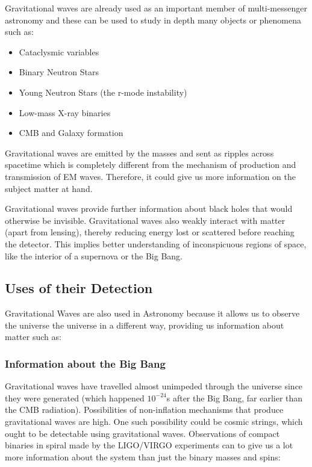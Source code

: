 \hspace{1cm}Gravitational waves are already used as an important member of multi-messenger astronomy and these can be used to study in depth many objects or phenomena such as:

\begin{itemize}

\item Cataclysmic variables
\item Binary Neutron Stars
\item Young Neutron Stars (the r-mode instability)
\item Low-mass X-ray binaries
\item CMB and Galaxy formation

\end{itemize}

\hspace{1cm}Gravitational waves are emitted by the masses and sent as ripples across spacetime which is completely different from the mechanism of production and transmission of EM waves. Therefore, it could give us more information on the subject matter at hand.

\hspace{1cm}Gravitational waves provide further information about black holes that would otherwise be invisible. Gravitational waves also weakly interact with matter (apart from lensing), thereby reducing energy lost or scattered before reaching the detector. This implies better understanding of inconspicuous regions of space, like the interior of a supernova or the Big Bang.

\subsection{Uses of their Detection}

\hspace{1cm} Gravitational Waves are also used in Astronomy because it allows us to observe the universe the universe in a different way, providing us information about matter such as:

\subsubsection*{Information about the Big Bang}
\hspace{1cm}Gravitational waves have travelled almost unimpeded through the universe since they were generated (which happened $10^{-24}$s after the Big Bang, far earlier than the CMB radiation). Possibilities of non-inflation mechanisms that produce gravitational waves are high. One such possibility could be cosmic strings, which ought to be detectable using gravitational waves. Observations of compact binaries in spiral made by the LIGO/VIRGO experiments can to give us a lot more information about the system than just the binary masses and spins:

